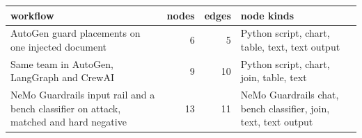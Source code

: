 \begin{tabular}{p{}rrp{}}
\toprule
workflow & nodes & edges & node kinds \\
\midrule
AutoGen guard placements on one injected document & 6 & 5 & Python script, chart, table, text, text output \\
Same team in AutoGen, LangGraph and CrewAI & 9 & 10 & Python script, chart, join, table, text \\
NeMo Guardrails input rail and a bench classifier on attack, matched and hard negative & 13 & 11 & NeMo Guardrails chat, bench classifier, join, text, text output \\
\bottomrule
\end{tabular}

